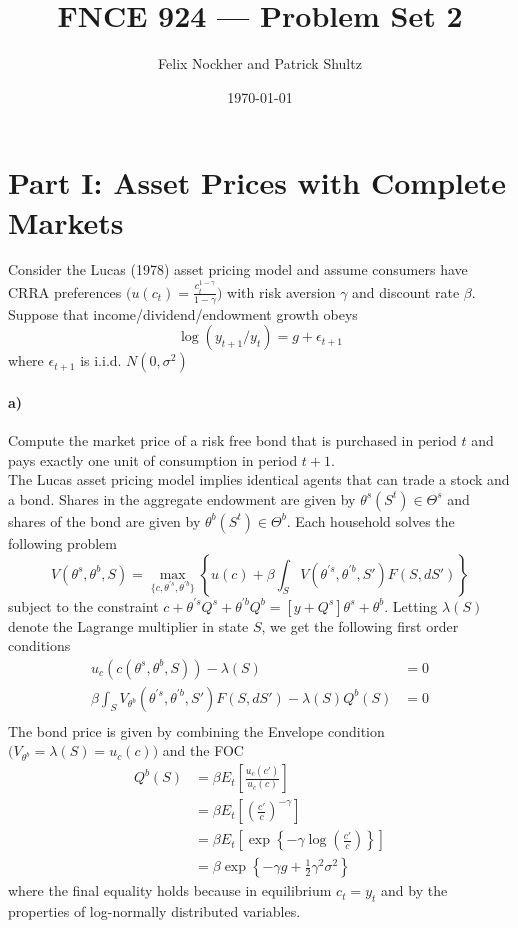 \documentclass[12pt,letter]{article}
\begin{document}
\title{FNCE 924 --- Problem Set 2}
\author{Felix Nockher and Patrick Shultz}
\date{\today}
\maketitle 
\section*{Part I: Asset Prices with Complete Markets}
Consider the Lucas (1978) asset pricing model and assume consumers have CRRA preferences $\bigg(u(c_t) = \frac{c_t^{1-\gamma}}{1-\gamma}\bigg)$ with risk aversion $\gamma$ and discount rate $\beta$. Suppose that income/dividend/endowment growth obeys 
\begin{equation*}
	\log(y_{t+1}/y_t) = g + \epsilon_{t+1}
\end{equation*}
where $\epsilon_{t+1}$ is i.i.d. $N(0, \sigma^2)$
\paragraph{a)}Compute the market price of a risk free bond that is purchased in period $t$ and pays exactly one unit of consumption in period $t+1$. \\

The Lucas asset pricing model implies identical agents that can trade a stock and a bond. Shares in the aggregate endowment are given by $\theta^s(S^t) \in \Theta^s$ and shares of the bond are given by $\theta^b(S^t)\in\Theta^b$. Each household solves the following problem
\begin{equation*}
	V(\theta^s, \theta^b, S) = \max_{\{c, \theta^{'s}, \theta^{'b}\}}\left\{u(c) + \beta \int_{S}V(\theta^{'s}, \theta^{'b}, S')F(S, dS')\right\}
\end{equation*}
subject to the constraint $c + \theta^{'s} Q^s + \theta^{'b}Q^b = \left[y + Q^s\right]\theta^s + \theta^b$. Letting $\lambda(S)$ denote the Lagrange multiplier in state $S$, we get the following first order conditions
\begin{equation*}
\begin{split}
	u_c(c(\theta^s, \theta^b, S))-\lambda(S) &= 0\\
	\beta \int_{S}V_{\theta^b}(\theta^{'s}, \theta^{'b}, S')F(S, dS') - \lambda(S)Q^b(S) &=0\\
\end{split}
\end{equation*}
The bond price is given by combining the Envelope condition $\bigg(V_{\theta^b} = \lambda(S) = u_c(c)\bigg)$ and the FOC
\begin{equation*}
\begin{split}
	Q^b(S) &= \beta E_t\left[\frac{u_c(c')}{u_c(c)}\right]\\
	&= \beta E_t\left[\left(\frac{c'}{c}\right)^{-\gamma}\right]\\
	&= \beta E_t\left[\exp\left\{-\gamma \log\left(\frac{c'}{c}\right) \right\}\right]\\
	& = \beta \exp\left\{-\gamma g + \frac{1}{2}\gamma^2\sigma^2\right\}
\end{split}
\end{equation*}
where the final equality holds because in equilibrium $c_t =y_t$ and by the properties of log-normally distributed variables. 
\end{document}
